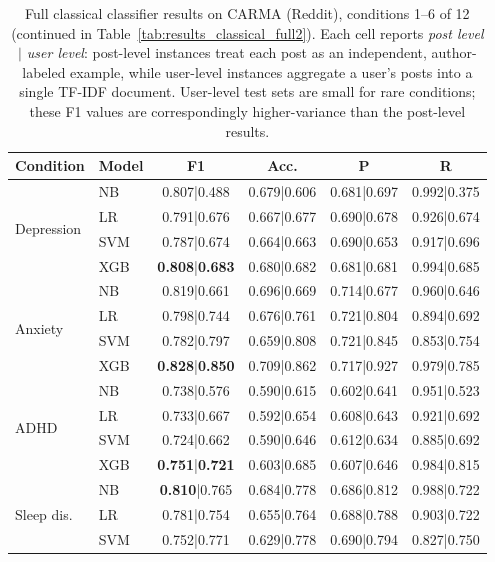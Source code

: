 \documentclass[letterpaper]{article} %
\begin{document}
\begin{table}[t]
\centering
\footnotesize
\setlength{\tabcolsep}{4pt}
\caption{Full classical classifier results on CARMA (Reddit), conditions 1--6 of 12 (continued in Table~\ref{tab:results_classical_full2}). Each cell reports \textit{post level $|$ user level}: post-level instances treat each post as an independent, author-labeled example, while user-level instances aggregate a user's posts into a single TF-IDF document. User-level test sets are small for rare conditions; these F1 values are correspondingly higher-variance than the post-level results.}
\label{tab:results_classical_full}
\begin{tabular}{llcccc}
\toprule
\textbf{Condition} & \textbf{Model} & \textbf{F1} & \textbf{Acc.} & \textbf{P} & \textbf{R} \\
\midrule
\multirow{4}{*}{Depression}
 & NB & 0.807|0.488 & 0.679|0.606 & 0.681|0.697 & 0.992|0.375 \\
 & LR & 0.791|0.676 & 0.667|0.677 & 0.690|0.678 & 0.926|0.674 \\
 & SVM & 0.787|0.674 & 0.664|0.663 & 0.690|0.653 & 0.917|0.696 \\
 & XGB & \textbf{0.808}|\textbf{0.683} & 0.680|0.682 & 0.681|0.681 & 0.994|0.685 \\
\midrule
\multirow{4}{*}{Anxiety}
 & NB & 0.819|0.661 & 0.696|0.669 & 0.714|0.677 & 0.960|0.646 \\
 & LR & 0.798|0.744 & 0.676|0.761 & 0.721|0.804 & 0.894|0.692 \\
 & SVM & 0.782|0.797 & 0.659|0.808 & 0.721|0.845 & 0.853|0.754 \\
 & XGB & \textbf{0.828}|\textbf{0.850} & 0.709|0.862 & 0.717|0.927 & 0.979|0.785 \\
\midrule
\multirow{4}{*}{ADHD}
 & NB & 0.738|0.576 & 0.590|0.615 & 0.602|0.641 & 0.951|0.523 \\
 & LR & 0.733|0.667 & 0.592|0.654 & 0.608|0.643 & 0.921|0.692 \\
 & SVM & 0.724|0.662 & 0.590|0.646 & 0.612|0.634 & 0.885|0.692 \\
 & XGB & \textbf{0.751}|\textbf{0.721} & 0.603|0.685 & 0.607|0.646 & 0.984|0.815 \\
\midrule
\multirow{4}{*}{Sleep dis.}
 & NB & \textbf{0.810}|0.765 & 0.684|0.778 & 0.686|0.812 & 0.988|0.722 \\
 & LR & 0.781|0.754 & 0.655|0.764 & 0.688|0.788 & 0.903|0.722 \\
 & SVM & 0.752|0.771 & 0.629|0.778 & 0.690|0.794 & 0.827|0.750 \\

\end{tabular}
\end{table}
\end{document}
